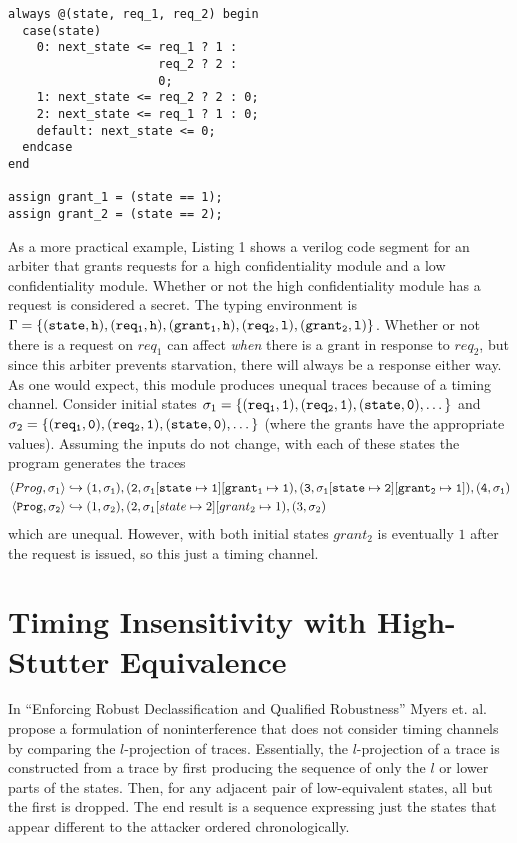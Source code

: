 \documentclass[paper=a4, fontsize=10pt]{scrartcl} %
\begin{document}
\begin{lstlisting}[frame=single,caption=An Arbiter in Verilog.]
always @(state, req_1, req_2) begin
  case(state)
    0: next_state <= req_1 ? 1 :
                     req_2 ? 2 :
                     0;
    1: next_state <= req_2 ? 2 : 0;
    2: next_state <= req_1 ? 1 : 0;
    default: next_state <= 0;
  endcase
end

assign grant_1 = (state == 1);
assign grant_2 = (state == 2);
\end{lstlisting}

As a more practical example, Listing 1 shows a verilog code segment for an 
arbiter that grants requests for a high confidentiality module and a low 
confidentiality module. Whether or not the high confidentiality module has a 
request is considered a secret.
The typing environment is
$\Gamma = \tt{\{(state, h), (req_1, h), (grant_1, h), (req_2, l), (grant_2, 
l)\}}$.
Whether or not there is a request on $req_1$ can affect \emph{when} there is a 
grant in response to $req_2$, but since this arbiter prevents starvation, there 
will always be a response either way. As one would expect, this module produces 
unequal traces because of a timing channel. Consider initial states
$\sigma_1 = \{(\tt{req_1}, 1), (\tt{req_2}, 1), (\tt{state}, 0), \dots\}$ and
$\sigma_2 = \{(\tt{req_1}, 0), (\tt{req_2}, 1), (\tt{state}, 0), \dots\}$ 
(where the grants have the appropriate values). Assuming the inputs do not 
change, with each of these states the program generates the traces
\begin{align*}
  \langle Prog, \sigma_1 \rangle & \hookrightarrow
  \tt
    (1, \sigma_1), (2, \sigma_1[state\mapsto1][grant_1\mapsto1),
    (3, \sigma_1[state\mapsto2][grant_2\mapsto1]), (4, \sigma_1) \\
    \tt
  \langle Prog, \sigma_2 \rangle & \hookrightarrow
    (1, \sigma_2), (2, \sigma_1[state\mapsto2][grant_2\mapsto1),
    (3, \sigma_2)
\end{align*}
which are unequal. However, with both initial states $grant_2$ is eventually
$1$ after the request is issued, so this just a timing channel.

\section{Timing Insensitivity with High-Stutter Equivalence}
In ``Enforcing Robust Declassification and Qualified Robustness'' Myers et. al. propose a formulation
of noninterference that does not consider 
timing channels by comparing the $l$-projection of traces. Essentially, the 
$l$-projection of a trace is constructed from a trace by first producing the 
sequence of only the $l$ or lower parts of the states. Then, for any adjacent 
pair of low-equivalent states, all but the first is dropped. The end result is 
a sequence expressing just the states that appear different to the attacker 
ordered chronologically.  
\end{document}
